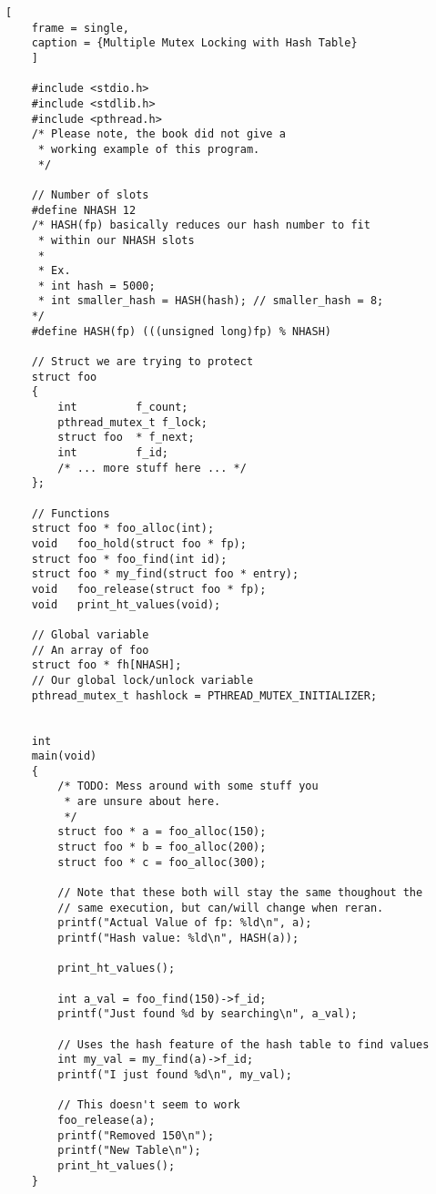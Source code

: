 \documentclass{article}
\begin{document}
\begin{lstlisting}[
    frame = single,
    caption = {Multiple Mutex Locking with Hash Table}
    ]

    #include <stdio.h>
    #include <stdlib.h>
    #include <pthread.h>
    /* Please note, the book did not give a 
     * working example of this program.
     */

    // Number of slots
    #define NHASH 12
    /* HASH(fp) basically reduces our hash number to fit 
     * within our NHASH slots
     *
     * Ex. 
     * int hash = 5000;
     * int smaller_hash = HASH(hash); // smaller_hash = 8;
    */
    #define HASH(fp) (((unsigned long)fp) % NHASH)

    // Struct we are trying to protect 
    struct foo 
    {
        int 		f_count;
        pthread_mutex_t f_lock;
        struct foo 	* f_next;
        int 		f_id;
        /* ... more stuff here ... */
    };

    // Functions
    struct foo * foo_alloc(int);
    void   foo_hold(struct foo * fp);
    struct foo * foo_find(int id);
    struct foo * my_find(struct foo * entry);
    void   foo_release(struct foo * fp);
    void   print_ht_values(void);

    // Global variable
    // An array of foo
    struct foo * fh[NHASH];
    // Our global lock/unlock variable
    pthread_mutex_t hashlock = PTHREAD_MUTEX_INITIALIZER;


    int
    main(void)
    {
        /* TODO: Mess around with some stuff you
         * are unsure about here.
         */
        struct foo * a = foo_alloc(150);
        struct foo * b = foo_alloc(200);
        struct foo * c = foo_alloc(300);

        // Note that these both will stay the same thoughout the
        // same execution, but can/will change when reran.
        printf("Actual Value of fp: %ld\n", a);
        printf("Hash value: %ld\n", HASH(a));

        print_ht_values();

        int a_val = foo_find(150)->f_id;
        printf("Just found %d by searching\n", a_val);

        // Uses the hash feature of the hash table to find values
        int my_val = my_find(a)->f_id;
        printf("I just found %d\n", my_val);

        // This doesn't seem to work
        foo_release(a);
        printf("Removed 150\n");
        printf("New Table\n");
        print_ht_values();
    }


\end{lstlisting}
\end{document}
